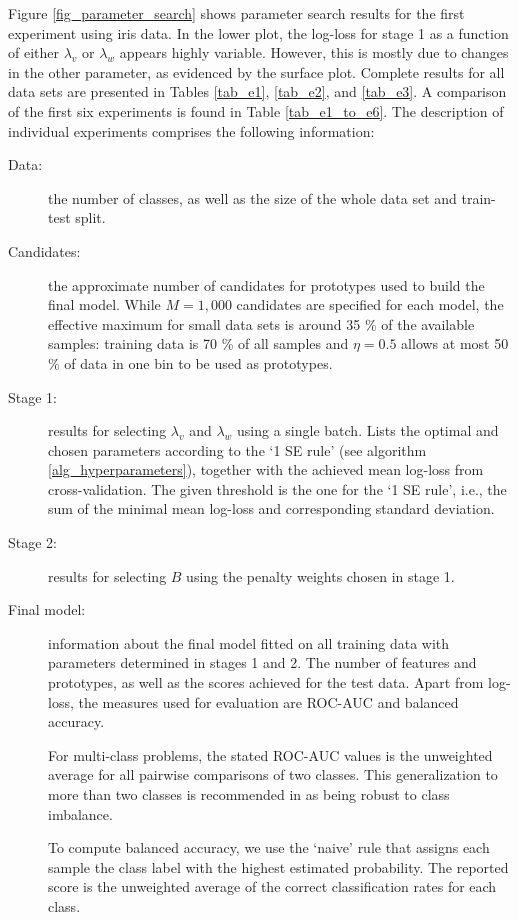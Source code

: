 %
Figure \ref{fig_parameter_search} shows parameter search results for the first experiment using iris data.
In the lower plot, the log-loss for stage 1 as a function of either $\lambda_v$ or $\lambda_w$ appears highly variable.
However, this is mostly due to changes in the other parameter, as evidenced by the surface plot.
Complete results for all data sets are presented in Tables \ref{tab_e1}, \ref{tab_e2}, and \ref{tab_e3}.
A comparison of the first six experiments is found in Table \ref{tab_e1_to_e6}.
The description of individual experiments comprises the following information:
%
\begin{description}
\item[Data:] the number of classes, as well as the size of the whole data set and train-test split.
%
\item[Candidates:] the approximate number of candidates for prototypes used to build the final model.
While $M=1,000$ candidates are specified for each model, the effective maximum for small data sets is around 35 \% of the available samples: training data is 70 \% of all samples and $\eta=0.5$ allows at most 50 \% of data in one bin to be used as prototypes.
%
\item[Stage 1:] results for selecting $\lambda_v$ and $\lambda_w$ using a single batch.
Lists the optimal and chosen parameters according to the `1 SE rule' (see algorithm \ref{alg_hyperparameters}), together with the achieved mean log-loss from cross-validation.
The given threshold is the one for the `1 SE rule', i.e., the sum of the minimal mean log-loss and corresponding standard deviation.
%
\item[Stage 2:] results for selecting $B$ using the penalty weights chosen in stage 1.
%
\item[Final model:] information about the final model fitted on all training data with parameters determined in stages 1 and 2.
The number of features and prototypes, as well as the scores achieved for the test data.
Apart from log-loss, the measures used for evaluation are ROC-AUC and balanced accuracy.\par
%
For multi-class problems, the stated ROC-AUC values is the unweighted average for all pairwise comparisons of two classes.
This generalization to more than two classes is recommended in \cite{Hand_01} as being robust to class imbalance.\par
%
To compute balanced accuracy, we use the `naive' rule that assigns each sample the class label with the highest estimated probability.
The reported score is the unweighted average of the correct classification rates for each class.
\end{description}
